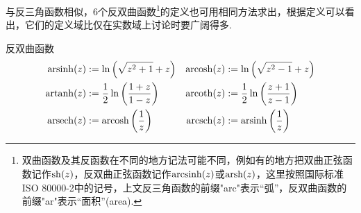 与反三角函数相似，6个反双曲函数\footnote{双曲函数及其反函数在不同的地方记法可能不同，例如有的地方把双曲正弦函数记作\({\rm sh}(z)\)，反双曲正弦函数记作\({\rm arcsinh}(z)\)或\({\rm arsh}(z)\)，这里按照国际标准ISO 80000-2中的记号，上文反三角函数的前缀"arc"表示“弧”，反双曲函数的前缀"ar"表示“面积”(area).}的定义也可用相同方法求出，根据定义可以看出，它们的定义域比仅在实数域上讨论时要广阔得多.
\begin{definition}{反双曲函数}
    \[
        \begin{aligned}
            {\rm arsinh}(z) &:= \ln\left(\sqrt{z^2+1}+z\right) & {\rm arcosh}(z) &:= \ln\left(\sqrt{z^2-1}+z\right) \\
            {\rm artanh}(z) &:= \frac{1}{2}\ln\left(\frac{1+z}{1-z}\right) & {\rm arcoth}(z) &:= \frac{1}{2}\ln\left(\frac{z+1}{z-1}\right) \\
            {\rm arsech}(z) &:= {\rm arcosh}\left(\frac{1}{z}\right) & {\rm arcsch}(z) &:= {\rm arsinh}\left(\frac{1}{z}\right)
        \end{aligned}
    \]
\end{definition}
